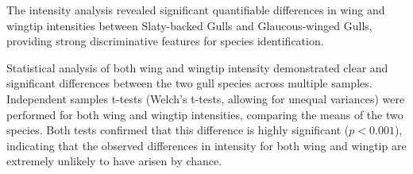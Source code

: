 \documentclass[a4paper,12pt]{report}
\begin{document}
The intensity analysis revealed significant quantifiable differences in wing and wingtip intensities between Slaty-backed Gulls and Glaucous-winged Gulls, providing strong discriminative features for species identification.

Statistical analysis of both wing and wingtip intensity demonstrated clear and significant differences between the two gull species across multiple samples. Independent samples t-tests (Welch's t-tests, allowing for unequal variances) were performed for both wing and wingtip intensities, comparing the means of the two species. Both tests confirmed that this difference is highly significant ($p < 0.001$), indicating that the observed differences in intensity for both wing and wingtip are extremely unlikely to have arisen by chance.

\begin{table}[H]
    \centering
    \caption{Wing and Wingtip Intensity Statistical Summary}
    \label{tab:intensity-stats-combined}
\end{table}


\end{document}
